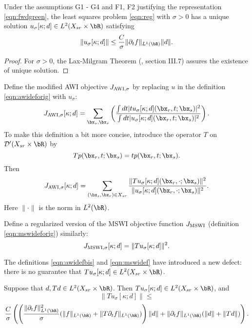 \begin{prop}
  \label{thm:unorm}
  Under the assumptions G1 - G4 and F1, F2 justifying the
  representation \ref{eqn:fwdgreen}, the least squares problem
  \ref{eqn:reg} with $\sigma > 0$ has a unique solution
  $u_{\sigma}[\kappa;d] \in L^2(X_{sr} \times \bR)$ satisfying
  \begin{equation}
    \label{eqn:unorm}
    \|u_{\sigma}[\kappa;d]\| \le \frac{C}{\sigma}\|\partial_t f\|_{L^1(\bR)}\|d\|.
  \end{equation}
\end{prop}
\begin{proof}
For $\sigma > 0$, the Lax-Milgram Theorem (\cite{Yosida}, section
III.7) assures the existence of unique solution. 
\end{proof}

Define the modified
AWI objective $J_{\rm AWI,\sigma}$ by
replacing $u$ in the definition \ref{eqn:awideforig} with $u_{\sigma}$:
\begin{equation}
  \label{eqn:awidef}
  J_{\rm AWI,\sigma}[\kappa;d] = \sum_{\bx_s,\bx_r} \left(\frac{\int dt |tu_{\sigma}[\kappa;d](\bx_r,t;\bx_s)|^2}{\int dt |u_{\sigma}[\kappa;d](\bx_r,t;\bx_s)|^2}\right). 
\end{equation}
To make this definition a bit more concise, introduce the operator $T$ on
${\cal D}'(X_{sr} \times \bR)$ by
\[
  Tp(\bx_r,t;\bx_s) = tp(\bx_r,t;\bx_s).
\]
Then
\begin{equation}
  \label{eqn:awidefbis}
  J_{\rm AWI,\sigma}[\kappa;d] = \sum_{(\bx_s,\bx_r) \in X_{sr}}
  \frac{\|Tu_{\sigma}[\kappa;d](\bx_r,\cdot;\bx_s)\|^2}{\|u_{\sigma}[\kappa;d](\bx_r,\cdot;\bx_s)\|^2}.
\end{equation}
Here $\| \cdot \|$ is the norm in $L^2(\bR)$.

Define a regularized version of the MSWI objective function $J_{\rm
  MSWI}$ (definition \ref{eqn:mswideforig}) similarly:
\begin{equation}
  \label{eqn:mswidef}
  J_{\rm MSWI,\sigma}[\kappa;d] = \|Tu_{\sigma}[\kappa;d]\|^2.
\end{equation}

The definitions \ref{eqn:awidefbis} and \ref{eqn:mswidef} have introduced a new defect: there is no
guarantee that $Tu_{\sigma}[\kappa;d] \in L^2(X_{sr} \times\bR)$.

\begin{prop}
  \label{thm:tl2}
  Suppose that $d, Td \in L^2(X_{sr} \times \bR)$. Then
  $Tu_{\sigma}[\kappa;d]  \in L^2(X_{sr} \times \bR)$, and
  \[
    \|Tu_{\sigma}[\kappa;d]\| \le
  \]
  \begin{equation}
    \label{eqn:tunorm}
    \frac{C}{\sigma}\left(\left(
        \frac{\|\partial_t f\|^2_{L^1(\bR)}}{\sigma}(\|f\|_{L^1(\bR)}+\|T\partial_tf\|_{L^1(\bR)})
      \right)\|d\| \\ 
    + \|\partial_t  f\|_{L^1(\bR)}(\|d\| +\|Td\|)\right).
  \end{equation}
\end{prop}

